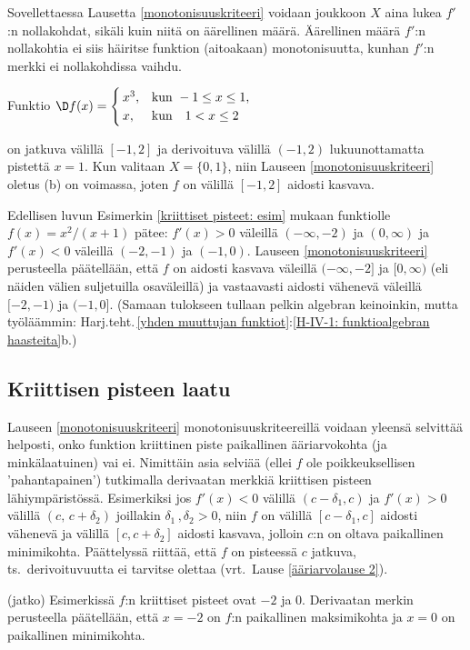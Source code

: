 Sovellettaessa Lausetta \ref{monotonisuuskriteeri} voidaan joukkoon $X$ aina lukea $f'$:n 
nollakohdat, sikäli kuin niitä on äärellinen määrä. Äärellinen määrä $f'$:n nollakohtia ei siis
häiritse funktion (aitoakaan) monotonisuutta, kunhan $f'$:n merkki ei nollakohdissa vaihdu.
\begin{Exa} Funktio
$\D f(x)=\begin{cases} 
         \,x^3, &\text{kun}\ -1\leq x\leq 1, \\ \,x, &\text{kun} \quad 1<x\leq 2
         \end{cases}$

on jatkuva välillä $[-1,2]$ ja derivoituva välillä $(-1,2)$ lukuunottamatta pistettä $x=1$.
Kun valitaan $X=\{0,1\}$, niin Lauseen \ref{monotonisuuskriteeri} oletus (b) on voimassa,
joten $f$ on välillä $[-1,2]$ aidosti kasvava. \loppu
\end{Exa}
\begin{Exa} \label{monotonisuus: esim} Edellisen luvun Esimerkin
\ref{kriittiset pisteet: esim} mukaan funktiolle $f(x)=x^2/(x+1)$ pätee: $f'(x)>0$
väleillä $(-\infty,-2)$ ja $(0,\infty)$ ja $f'(x)<0$ väleillä $(-2,-1)$ ja $(-1,0)$. Lauseen
\ref{monotonisuuskriteeri} perusteella päätellään, että $f$ on aidosti kasvava väleillä
$(-\infty,-2]$ ja $[0,\infty)$ (eli näiden välien suljetuilla osaväleillä) ja vastaavasti
aidosti vähenevä väleillä $[-2,-1)$ ja $(-1,0]$. 
(Samaan tulokseen tullaan pelkin algebran keinoinkin, mutta työläämmin:
Harj.teht.\,\ref{yhden muuttujan funktiot}:\ref{H-IV-1: funktioalgebran haasteita}b.)
\loppu \end{Exa}

\subsection*{Kriittisen pisteen laatu}

Lauseen \ref{monotonisuuskriteeri} monotonisuuskriteereillä voidaan yleensä selvittää helposti,
onko funktion kriittinen piste paikallinen ääriarvokohta (ja minkälaatuinen) vai ei. Nimittäin
asia selviää (ellei $f$ ole poikkeuksellisen 'pahantapainen') tutkimalla derivaatan merkkiä 
kriittisen pisteen lähiympäristössä. Esimerkiksi jos $f'(x)<0$ välillä $(c-\delta_1,c)$ ja 
$f'(x)>0$ välillä $(c,\,c+\delta_2)$ joillakin $\delta_1\,,\delta_2>0$, niin $f$ on välillä 
$[c-\delta_1,c]$ aidosti vähenevä ja välillä $[c,c+\delta_2]$ aidosti kasvava, jolloin $c$:n 
on oltava paikallinen minimikohta. Päättelyssä riittää, että $f$ on pisteessä $c$ jatkuva, ts.\
derivoituvuutta ei tarvitse olettaa (vrt.\ Lause \ref{ääriarvolause 2}).
\jatko \begin{Exa} (jatko) Esimerkissä $f$:n kriittiset pisteet ovat $-2$ ja $0$. Derivaatan
merkin perusteella päätellään, että $x=-2$ on $f$:n paikallinen maksimikohta ja $x=0$ on
paikallinen minimikohta. \loppu
\end{Exa}

